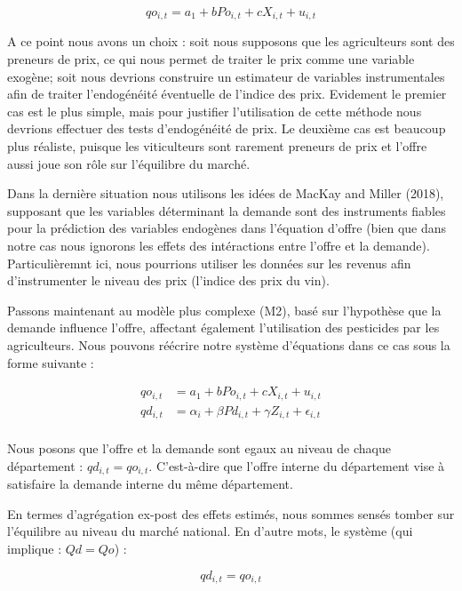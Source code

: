 \documentclass[11pt,]{article}
\begin{document}
\begin{equation*}
  qo_{i,t} = a_1 + b Po_{i,t} + c X_{i,t} + u_{i,t}
\end{equation*}

A ce point nous avons un choix : soit nous supposons que les
agriculteurs sont des preneurs de prix, ce qui nous permet de traiter le
prix comme une variable exogène; soit nous devrions construire un
estimateur de variables instrumentales afin de traiter l'endogénéité
éventuelle de l'indice des prix. Evidement le premier cas est le plus
simple, mais pour justifier l'utilisation de cette méthode nous devrions
effectuer des tests d'endogénéité de prix. Le deuxième cas est beaucoup
plus réaliste, puisque les viticulteurs sont rarement preneurs de prix
et l'offre aussi joue son rôle sur l'équilibre du marché.

Dans la dernière situation nous utilisons les idées de MacKay and Miller
(2018), supposant que les variables déterminant la demande sont des
instruments fiables pour la prédiction des variables endogènes dans
l'équation d'offre (bien que dans notre cas nous ignorons les effets des
intéractions entre l'offre et la demande). Particulièremnt ici, nous
pourrions utiliser les données sur les revenus afin d'instrumenter le
niveau des prix (l'indice des prix du vin).

Passons maintenant au modèle plus complexe (M2), basé sur l'hypothèse
que la demande influence l'offre, affectant également l'utilisation des
pesticides par les agriculteurs. Nous pouvons réécrire notre système
d'équations dans ce cas sous la forme suivante :

\begin{align*}
  qo_{i,t} & = a_1 + b Po_{i,t} + c X_{i,t} + u_{i,t} \\ 
  qd_{i,t} & = \alpha_{i} + \beta Pd_{i,t} + \gamma Z_{i,t} + \epsilon_{i,t}  \\
\end{align*}

Nous posons que l'offre et la demande sont egaux au niveau de chaque
département : \(qd_{i,t} = qo_{i,t}\). C'est-à-dire que l'offre interne
du département vise à satisfaire la demande interne du même département.

En termes d'agrégation ex-post des effets estimés, nous sommes sensés
tomber sur l'équilibre au niveau du marché national. En d'autre mots, le
système (qui implique : \(Qd = Qo\)) :

\begin{equation*}
  qd_{i,t} = qo_{i,t}
\end{equation*}
\end{document}
